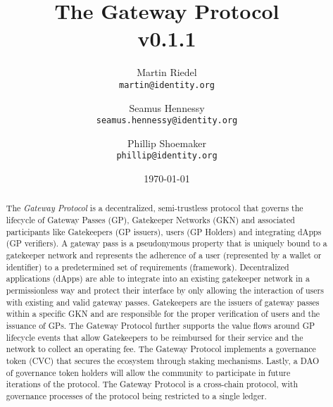 \documentclass[12pt]{article}
\title{The Gateway Protocol\\ \small v0.1.1}
\author{
        \small Martin Riedel\\
        \small \texttt{martin@identity.org}
        \and
        \small Seamus Hennessy\\
        \small \texttt{seamus.hennessy@identity.org}
        \and
        \small Phillip Shoemaker\\
        \small \texttt{phillip@identity.org}
}
\date{\today}
\begin{document}
\maketitle

\begin{abstract}
The \textit{Gateway Protocol} is a decentralized, semi-trustless protocol that governs the lifecycle of Gateway Passes (GP), Gatekeeper Networks (GKN) and associated participants like Gatekeepers (GP issuers), users (GP Holders) and integrating dApps (GP verifiers). A gateway pass is a pseudonymous property that is uniquely bound to a gatekeeper network and represents the adherence of a user (represented by a wallet or identifier) to a predetermined set of requirements (framework). Decentralized applications (dApps) are able to integrate into an existing gatekeeper network in a permissionless way and protect their interface by only allowing the interaction of users with existing and valid gateway passes. Gatekeepers are the issuers of gateway passes within a specific GKN and are responsible for the proper verification of users and the issuance of GPs. The Gateway Protocol further supports the value flows around GP lifecycle events that allow Gatekeepers to be reimbursed for their service and the network to collect an operating fee. The Gateway Protocol implements a governance token (CVC) that secures the ecosystem through staking mechanisms. Lastly, a DAO of governance token holders will allow the community to participate in future iterations of the protocol. The Gateway Protocol is a cross-chain protocol, with governance processes of the protocol being restricted to a single ledger.
\end{abstract}

\normalsize






















\end{document}
